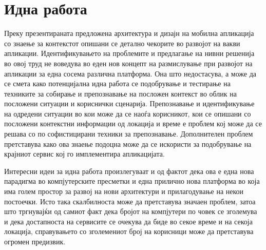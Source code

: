 \section{Идна работа}

Преку презентираната предложена архитектура и дизајн на мобилна апликација со
знаење за контекстот опишани се детално чекорите во развојот на вакви апликации.
Идентификувањето на проблемите и предлагање на нивни решенија во овој труд не
воведува во еден нов концепт на размислување при развојот на апликации за една
сосема различна платформа. Она што недостасува, а може да се смета како
потенцијална идна работа се подобрување и тестирање на техниките за собирање и
препознавање на посложен контекст во облик на посложени ситуации и кориснички
сценарија. Препознавање и идентификување на одредени ситуации во кои може да се
наоѓа корисникот, кои се опишани со посложени контекстни информации од локација
и време е проблем кој може да се решава со по софистицирани техники за
препознавање. Дополнителен проблем претставува како ова знаење подоцна може да
се искористи за подобрување на крајниот сервис кој го имплементира апликацијата.

Интересни идеи за идна работа произлегуваат и од фактот дека ова е една нова
парадигма во компјутерските пресметки и една прилично нова платформа во која има
голем простор за развој на нови архитектури и прилагодување на некои постоечки.
Исто така скалбилноста може да претставува значаен проблем, затоа што тргнувајќи
од самиот факт дека бројот на компјутери по човек се зголемува и дека
достапноста на сервисите се очекува да биде во секое време и на секоја локација,
справувањето со зголемениот број на корисници може да претставува огромен
предизвик.
